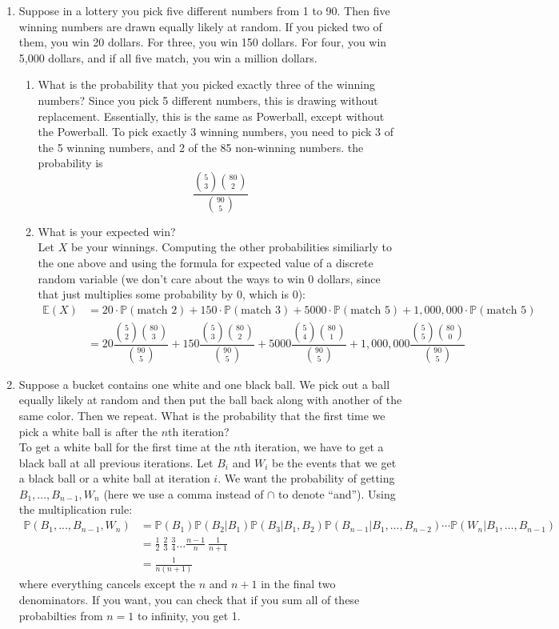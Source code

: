 \documentclass[12pt]{article}
\def\P{{\mathbb P}}
\def\E{{\mathbb E}}
\begin{document}
\begin{enumerate}
\item Suppose in a lottery you pick five different numbers from 1 to 90. Then five winning numbers are drawn equally likely at random. If you picked two of them, you win 20 dollars. For three, you win 150 dollars. For four, you win 5,000 dollars, and if all five match, you win a million dollars.
\begin{enumerate}
\item What is the probability that you picked exactly three of the winning numbers?
Since you pick 5 different numbers, this is drawing without replacement. Essentially, this is the same as Powerball, except without the Powerball. To pick exactly 3 winning numbers, you need to pick 3 of the 5 winning numbers, and 2 of the 85 non-winning numbers. the probability is
\[
\dfrac{ \binom{5}{3} \binom{80}{2} }{ \binom{90}{5} }
\]
\item What is your expected win?\\
Let $X$ be your winnings. Computing the other probabilities similiarly to the one above and using the formula for expected value of a discrete random variable (we don't care about the ways to win 0 dollars, since that just multiplies some probability by 0, which is 0):
\begin{align*}
\E(X) &= 20\cdot\P(\text{match 2}) + 150\cdot\P(\text{match 3}) + 5000\cdot\P(\text{match 5}) + 1,000,000\cdot\P(\text{match 5})\\
&= 20 \dfrac{ \binom{5}{2} \binom{80}{3} }{ \binom{90}{5} } + 150 \dfrac{ \binom{5}{3} \binom{80}{2} }{ \binom{90}{5} } + 5000\dfrac{ \binom{5}{4} \binom{80}{1} }{ \binom{90}{5} } + 1,000,000\dfrac{ \binom{5}{5} \binom{80}{0} }{ \binom{90}{5} }
\end{align*}
\end{enumerate}

\item Suppose a bucket contains one white and one black ball. We pick out a ball equally likely at random and then put the ball back along with another of the same color. Then we repeat. What is the probability that the first time we pick a white ball is after the $n$th iteration?\\

To get a white ball for the first time at the $n$th iteration, we have to get a black ball at all previous iterations. Let $B_i$ and $W_i$ be the events that we get a black ball or a white ball at iteration $i$. We want the probability of getting $B_1, ..., B_{n-1}, W_n$ (here we use a comma instead of $\cap$ to denote ``and''). Using the multiplication rule:
\begin{align*}
\P(B_1, ..., B_{n-1}, W_n) &= \P(B_1)\P(B_2|B_1)\P(B_3|B_1, B_2)\P(B_{n-1}|B_1, \dots, B_{n-2})\cdots \P(W_n|B_1, \dots, B_{n-1}) \\
&= \frac{1}{2} \: \frac{2}{3} \: \frac{3}{4} \dots \frac{n-1}{n} \:\frac{1}{n+1} \\
&= \frac{1}{n(n+1)}
\end{align*}
where everything cancels except the $n$ and $n+1$ in the final two denominators. If you want, you can check that if you sum all of these probabilties from $n = 1$ to infinity, you get 1.

\end{enumerate}
\end{document}
